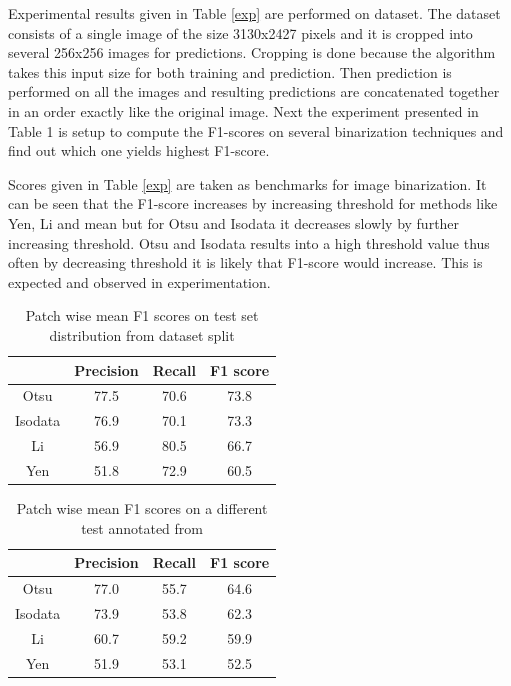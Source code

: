 \documentclass[11pt]{article}
\begin{document}
Experimental results given in Table \ref{exp} are performed on \cite{dino2020} dataset. The dataset consists of a single image of the size 3130x2427 pixels and it is cropped into several 256x256 images for predictions. Cropping is done because the algorithm takes this input size for both training and prediction. Then prediction is performed on all the images and resulting predictions are concatenated together in an order exactly like the original image. Next the experiment presented in Table 1 is setup to compute the F1-scores on several binarization techniques and find out which one yields highest F1-score.

Scores given in Table \ref{exp} are taken as benchmarks for image binarization. It can be seen that the F1-score increases by increasing threshold for methods like Yen, Li and mean but for Otsu and Isodata it decreases slowly by further increasing threshold. Otsu and Isodata results into a high threshold value thus often by decreasing threshold it is likely that F1-score would increase. This is expected and observed in experimentation. 

\begin{table}[H]
	\centering
	\caption{Patch wise mean F1 scores on test set distribution from dataset split}
	\begin{tabular}{c|c|c|c|}
		\cline{2-4}
		\multicolumn{1}{l|}{}         & Precision & Recall & F1 score \\ \hline
		\multicolumn{1}{|c|}{Otsu}    & 77.5      & 70.6   & 73.8     \\ \hline
		\multicolumn{1}{|c|}{Isodata} & 76.9      & 70.1   & 73.3     \\ \hline
		\multicolumn{1}{|c|}{Li}      & 56.9      & 80.5   & 66.7     \\ \hline
		\multicolumn{1}{|c|}{Yen}     & 51.8      & 72.9   & 60.5     \\ \hline
	\end{tabular}
\label{mine}
\end{table}



\begin{table}[H]
	\centering
	\caption{Patch wise mean F1 scores on a different test annotated from \cite{dino2020}}
	\begin{tabular}{c|c|c|c|}
		\cline{2-4}
		\multicolumn{1}{l|}{}         & Precision & Recall & F1 score \\ \hline
		\multicolumn{1}{|c|}{Otsu}    & 77.0      & 55.7   & 64.6     \\ \hline
		\multicolumn{1}{|c|}{Isodata} & 73.9      & 53.8   & 62.3     \\ \hline
		\multicolumn{1}{|c|}{Li}      & 60.7      & 59.2   & 59.9     \\ \hline
		\multicolumn{1}{|c|}{Yen}     & 51.9      & 53.1   & 52.5     \\ \hline
	\end{tabular}
\label{dino}
\end{table}
\end{document}
